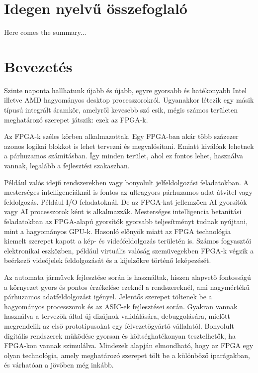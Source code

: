 \documentclass[a4paper,12pt,oneside]{book}
\begin{document}
\chapter{Idegen nyelvű összefoglaló}
Here comes the summary...


\chapter{Bevezetés}
Szinte naponta hallhatunk újabb és újabb, egyre gyorsabb és hatékonyabb Intel illetve AMD hagyományos desktop processzorokról. Ugyanakkor létezik egy másik típusú integrált áramkör, amelyről kevesebb szó esik, mégis számos területen meghatározó szerepet játszik: ezek az FPGA-k. 

Az FPGA-k széles körben alkalmazottak. Egy FPGA-ban akár több százezer azonos logikai blokkot is lehet tervezni és megvalósítani. Emiatt kiválóak lehetnek a párhuzamos számításban. Így minden terület, ahol ez fontos lehet, használva vannak, legalább a fejlesztési szakaszban. 

Például valós idejű rendszerekben vagy bonyolult jelfeldolgozási feladatokban. A mesterséges intelligenciáknál is fontos az ultragyors párhuzamos adat átvitel vagy feldolgozás. Például I/O feladatoknál. De az FPGA-kat jellemzően AI gyorsítók vagy AI processzorok ként is alkalmazzák. Mesterséges intelligencia betanítási feladatokban az FPGA-alapú gyorsítók gyorsabb teljesítményt tudnak nyújtani, mint a hagyományos GPU-k. Hasonló előnyök miatt az FPGA technológia kiemelt szerepet kapott a kép- és videófeldolgozás területén is. Számos fogyasztói elektronikai eszközben, például virtuális valóság szemüvegekben FPGA-k végzik a beérkező videójelek feldolgozását és a kijelzőkre történő leképezését. 

Az automata járművek fejlesztése során is használtak, hiszen alapvető fontosságú a környezet gyors és pontos érzékelése ezeknél a rendszereknél, ami nagymértékű párhuzamos adatfeldolgozást igényel. Jelentős szerepet töltenek be a hagyományos processzorok és az ASIC-ek fejlesztései során. Gyakran vannak használva a tervezők által új dizájnok validálására, debuggolására, mielőtt megrendelik az első prototípusokat egy félvezetőgyártó vállalatól. Bonyolult digitális rendszerek működése gyorsan és költséghatékonyan tesztelhetők, ha FPGA-kon vannak szimulálva. Mindezek alapján elmondható, hogy az FPGA egy olyan technológia, amely meghatározó szerepet tölt be a különböző iparágakban, és várhatóan a jövőben még inkább. 
\end{document}
